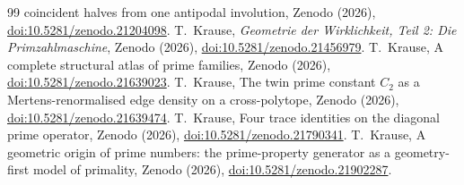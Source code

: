 \documentclass[11pt,a4paper]{article}
\theoremstyle{plain}
\theoremstyle{definition}
\theoremstyle{remark}
\begin{document}
\begin{thebibliography}{99}
coincident halves from one antipodal involution, Zenodo (2026),
\href{https://doi.org/10.5281/zenodo.21204098}{doi:10.5281/zenodo.21204098}.
 T.~Krause, \emph{Geometrie der Wirklichkeit, Teil 2: Die
Primzahlmaschine}, Zenodo (2026),
\href{https://doi.org/10.5281/zenodo.21456979}{doi:10.5281/zenodo.21456979}.
 T.~Krause, A complete structural atlas of prime families,
Zenodo (2026),
\href{https://doi.org/10.5281/zenodo.21639023}{doi:10.5281/zenodo.21639023}.
 T.~Krause, The twin prime constant $C_2$ as a
Mertens-renormalised edge density on a cross-polytope, Zenodo (2026),
\href{https://doi.org/10.5281/zenodo.21639474}{doi:10.5281/zenodo.21639474}.
 T.~Krause, Four trace identities on the diagonal prime
operator, Zenodo (2026),
\href{https://doi.org/10.5281/zenodo.21790341}{doi:10.5281/zenodo.21790341}.
 T.~Krause, A geometric origin of prime numbers: the
prime-property generator as a geometry-first model of primality, Zenodo
(2026), \href{https://doi.org/10.5281/zenodo.21902287}{doi:10.5281/zenodo.21902287}.
\end{thebibliography}
\end{document}
